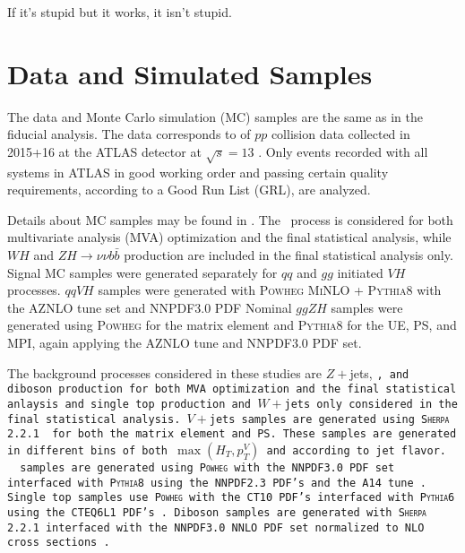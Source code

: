 \begin{savequote}[75mm]
If it's stupid but it works, it isn't stupid.
\end{savequote}

\chapter{Data and Simulated Samples}


The data and Monte Carlo simulation (MC) samples are the same as in the fiducial analysis.  The data corresponds to \LUMI of $pp$ collision data collected in 2015+16 at the ATLAS detector at $\sqrt{s}=13$ \TeV.  Only events recorded with all systems in ATLAS in good working order and passing certain quality requirements, according to a Good Run List (GRL), are analyzed.

Details about MC samples may be found in \cite{modelingnote}.  The \ZH\, process is considered for both multivariate analysis (MVA) optimization and the final statistical analysis, while $WH$ and $ZH\to\nu\nu b\bar{b}$ production are included in the final statistical analysis only.  Signal MC samples were generated separately for $qq$ and $gg$ initiated $VH$ processes.  $qqVH$ samples were generated with \textsc{Powheg MiNLO + Pythia8} with the AZNLO tune set and NNPDF3.0 PDF%
  Nominal $ggZH$ samples were generated using \textsc{Powheg} for the matrix element and \textsc{Pythia8} for the UE, PS, and MPI, again applying the AZNLO tune and NNPDF3.0 PDF set. \cite{support17}

The background processes considered in these studies are $Z+$jets, \tt, and diboson production for both MVA optimization and the final statistical anlaysis and single top production and $W+$jets only considered in the final statistical analysis.  $V+$jets samples are generated using \textsc{Sherpa 2.2.1} \cite{support18} for both the matrix element and PS.  These samples are generated in different bins of both $\max\left(H_T,p_T^V\right)$ and according to jet flavor. \tt\, samples are generated using \textsc{Powheg} with the NNPDF3.0 PDF set interfaced with \textsc{Pythia8} using the NNPDF2.3 PDF's and the A14 tune \cite{support19}.  Single top samples use \textsc{Powheg} with the CT10 PDF's interfaced with \textsc{Pythia6} using the CTEQ6L1 PDF's \cite{support20,support21}.  Diboson samples are generated with \textsc{Sherpa 2.2.1} interfaced with the NNPDF3.0 NNLO PDF set normalized to NLO cross sections \cite{support22}.

